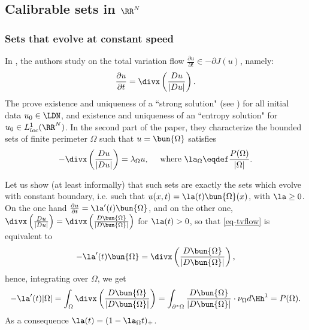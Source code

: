 

\subsection{Calibrable sets in $\RR^N$}

\subsubsection{Sets that evolve at constant speed}
In \cite{beltvflow02}, the authors study on the total variation flow $\frac{\partial u}{\partial t}\in -\partial J(u)$, namely:
\begin{align}
  \frac{\partial u}{\partial t}= \divx \left(\frac{Du}{|Du|} \right).
  \label{eq-tvflow}
\end{align}
The prove existence and uniqueness of a ``strong solution" (see \cite{beltvflow02}) for all initial data $u_0\in \LDN$, and existence and uniqueness of an ``entropy solution" for $u_0\in L^1_{loc}(\RR^N)$.
In the second part of the paper, they characterize the bounded sets of finite perimeter $\Omega$ such that $u=\bun{\Omega}$ satisfies
\begin{align}
  -\divx \left(\frac{Du}{|Du|}\right)= \lambda_\Omega u, \quad \mbox{ where } \la_\Omega\eqdef \frac{P(\Omega)}{|\Omega|}.
\end{align}

Let us show (at least informally) that such sets are exactly the sets which evolve with constant boundary, i.e. such that $u(x,t)=\la(t)\bun{\Omega}(x)$, with $\la \geq 0$.
On the one hand $\frac{\partial u}{\partial t}= \la'(t)\bun{\Omega}$, and on the other one, $\divx \left(\frac{Du}{|Du|}\right)=\divx\left(\frac{D\bun{\Omega}}{|D\bun{\Omega}|} \right) $ for $\la(t)>0$, so that \eqref{eq-tvflow} is equivalent to
\begin{align*}
  -\la'(t)\bun{\Omega}= \divx \left(\frac{D\bun{\Omega}}{|D\bun{\Omega}|}\right),
\end{align*}
hence, integrating over $\Omega$, we get 
\begin{align*}
  -\la'(t) |\Omega|=\int_\Omega \divx\left(\frac{D\bun{\Omega}}{|D\bun{\Omega}|} \right)=\int_{\partial^* \Omega} \frac{D\bun{\Omega}}{|D\bun{\Omega}|}\cdot \nu_{\Omega}d\Hh^1=P(\Omega).
\end{align*}
As a consequence $\la(t)=(1-\la_\Omega t)_+$.


